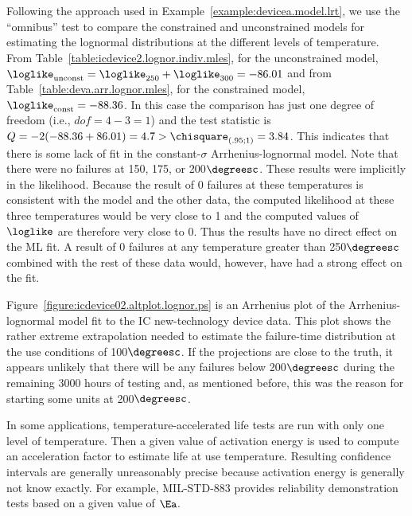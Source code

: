 \begin{example}
Following the approach used in
Example~\ref{example:devicea.model.lrt}, we use the ``omnibus'' test
to compare the constrained and unconstrained models for estimating the
lognormal distributions at the different levels of temperature.  From
Table~\ref{table:icdevice2.lognor.indiv.mles}, for the unconstrained
model, $\loglike_{\rm unconst}=\loglike_{250} +
\loglike_{300}  = -86.01$ and from
Table~\ref{table:deva.arr.lognor.mles}, for the constrained model,
$\loglike_{\rm const}= -88.36$.  In this case the comparison has just
one degree of freedom (i.e., $dof=4-3=1$) and the test statistic is
$Q=-2(-88.36 +86.01 ) =4.7>
\chisquare_{(.95;1)} =3.84$. This indicates that there 
is some lack of fit in the constant-$\sigma$ Arrhenius-lognormal
model. Note that there were no failures at 150, 175, or
200$\degreesc$.  These results were implicitly in the likelihood.
Because the result of 0 failures at these temperatures is consistent
with the model and the other data, the computed likelihood at these
three temperatures would be very close to 1 and the computed values
of $\loglike$ are therefore very close to 0. Thus the results have
no direct effect on the ML fit. A result of 0 failures at any
temperature greater than 250$\degreesc$ combined with the rest of
these data would, however, have had a strong effect on the fit.

Figure~\ref{figure:icdevice02.altplot.lognor.ps} is an Arrhenius
plot of the Arrhenius-lognormal model fit to the IC new-technology
device data.  This plot shows the rather extreme extrapolation
needed to estimate the failure-time distribution at the use
conditions of 100$\degreesc$.  If the projections are close to the
truth, it appears unlikely that there will be any failures below
200$\degreesc$ during the remaining 3000 hours of testing and, as
mentioned before, this was the reason for starting some units at
200$\degreesc$.
\end{example}

In some applications, temperature-accelerated life tests are run
with only one level of temperature. Then a given value of activation
energy is used to compute an acceleration factor to estimate life at
use temperature. Resulting confidence intervals are generally
unreasonably precise because activation energy is generally not know
exactly.  For example, MIL-STD-883 provides reliability
demonstration tests based on a given value of $\Ea$.

